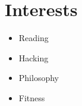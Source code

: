 \section*{Interests}

\begin{itemize}
  \item Reading
  \item Hacking
  \item Philosophy
  \item Fitness
\end{itemize}
